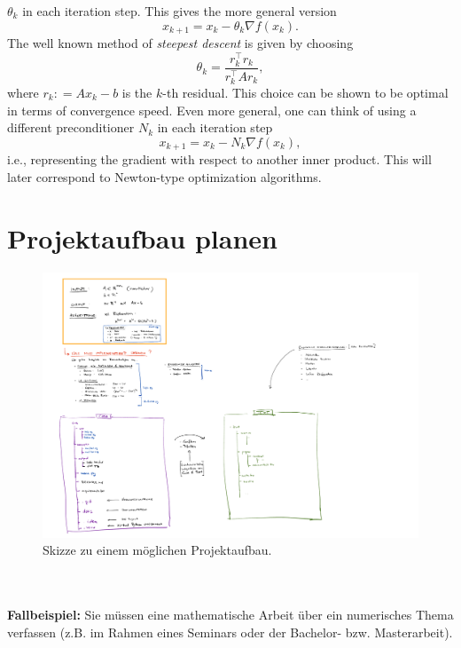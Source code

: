 $\theta_k$  in each iteration step. This gives the more general version
\begin{equation}\label{steepest_descent_method}
	x_{k+1} = x_{k} - \theta_k  \nabla f (x_{k} ).
\end{equation}
The well known method of \textit{steepest descent} is given by choosing
\begin{equation} \label{steepest_descent_stepsize}
	\theta_k  = \frac{r_k^\top r_k}{ r_k^\top   Ar_k  },
\end{equation}
where $r_k : = Ax_{k} - b$ is the $k$-th residual. This choice can be shown to be optimal in terms of convergence
speed. Even more general, one can think of using a different preconditioner $N_k$ in each iteration step
$$x_{k+1} = x_{k} - N_k \nabla f (x_{k} ),$$ 
i.e., representing the gradient with respect to another inner product. This will later correspond to Newton-type optimization algorithms.
\clearpage
\section{Projektaufbau planen}
\begin{figure}[h!]
	\centering
	\includegraphics[width=1.3
	\linewidth]{./media//ProjectMindMap2}
	\caption[Mindmap zum Projektaufbau]{Skizze zu einem möglichen Projektaufbau.}
	\label{fig:projektaufbau}
\end{figure}
~\\~\\
\textbf{Fallbeispiel:} Sie müssen eine mathematische Arbeit über ein numerisches Thema verfassen (z.B. im Rahmen eines Seminars oder der Bachelor- bzw. Masterarbeit).

